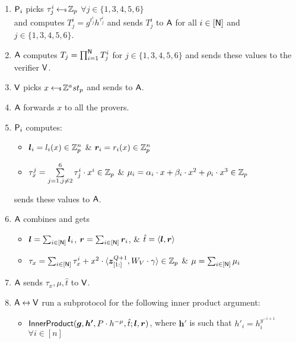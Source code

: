 \begin{enumerate}
	\item $\mathsf{P}_i$ picks $\tau^i_j \hskip2.3pt{\gets\!\!\mbox{\tiny${\$}$\normalsize}}\, \mathbb{Z}_p$ $\forall j\in\{1,3,4,5,6\}$\\
	and computes $T_j^i = g^{t_j^i}h^{\tau_j^i}$ and sends $T_j^i$ to $\mathsf{A}$ for all $i\in [\mathsf{N}]$ and $j\in \{1,3,4,5,6\}$.
	
	\item $\mathsf{A}$ computes $T_j = \prod_{i=1}^{\mathsf{N}} T_j^i$ for $j \in \{1,3,4,5,6\}$ and sends these values to the verifier $\mathsf{V}$.
	
	\item $\mathsf{V}$ picks $x\hskip2.3pt{\gets\!\!\mbox{\tiny${\$}$\normalsize}}\, \mathbb{Z}^ast_p$ and sends to $\mathsf{A}$.
	
	\item $\mathsf{A}$ forwards $x$ to all the provers.
	
	\item $\mathsf{P}_i$ computes:
	\begin{itemize}
		\item $\bm{l}_i = l_i(x) \in \mathbb{Z}^n_p$ \& $\bm{r}_i = r_i(x) \in \mathbb{Z}^n_p$
		\item $\tau_x^j = \sum\limits_{j=1, j\neq 2}^{6} \tau_j^i\cdot x^i \in \mathbb{Z}_p$ \& $\mu_i = \alpha_i\cdot x +\beta_i \cdot x^2 +\rho_i\cdot x^3 \in \mathbb{Z}_p$
	\end{itemize}  
	sends these values to $\mathsf{A}$.
	
	\item $\mathsf{A}$ combines and gets 
	\begin{itemize} 
		\item $\bm{l} = \sum_{i\in[\mathsf{N}]} \bm{l}_i$, $\bm{r} = \sum_{i\in[\mathsf{N}]} \bm{r}_i$, \& $\hat{t} = \langle \bm{l},\bm{r}\rangle$
		\item $\tau_x = \sum_{i\in [\mathsf{N}]} \tau_x^i + x^2\cdot \langle \bm{z}_{[1:]}^{Q+1},W_V\cdot \gamma\rangle \in \mathbb{Z}_p$ \& $\mu = \sum_{i\in [\mathsf{N}]} \mu_i$
	\end{itemize}
	
	\item $\mathsf{A}$ sends $\tau_x, \mu, \hat{t}$ to $\mathsf{V}$. 
	
	\item $\mathsf{A} \leftrightarrow \mathsf{V}$ run a subprotocol for the following inner product argument:
	\begin{itemize}
		\item $\mathsf{InnerProduct}(\bm{g}, \bm{h'}, P\cdot h^{-\mu}, \hat{t}; \bm{l},\bm{r})$, where $\bm{h'}$ is such that $h'_i = h_i^{y^{-i+1}}$ $\forall i\in[n]$
	\end{itemize} 
\end{enumerate}

